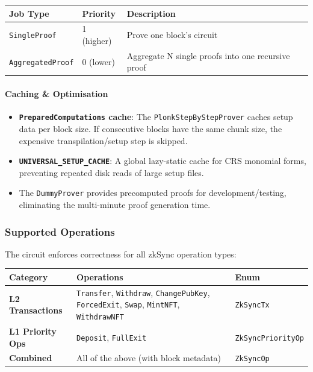 \begin{table}[h]
\centering
\begin{tabular}{lll}
\toprule
\textbf{Job Type} & \textbf{Priority} & \textbf{Description} \\
\midrule
\texttt{SingleProof} & 1 (higher) & Prove one block's circuit \\
\texttt{AggregatedProof} & 0 (lower) & Aggregate N single proofs into one recursive proof \\
\bottomrule
\end{tabular}
\end{table}

\paragraph{Caching \& Optimisation}

\begin{itemize}
    \item \textbf{\texttt{PreparedComputations} cache}: The \texttt{PlonkStepByStepProver} caches setup data per block size. If consecutive blocks have the same chunk size, the expensive transpilation/setup step is skipped.
    \item \textbf{\texttt{UNIVERSAL\_SETUP\_CACHE}}: A global lazy-static cache for CRS monomial forms, preventing repeated disk reads of large setup files.
    \item The \texttt{DummyProver} provides precomputed proofs for development/testing, eliminating the multi-minute proof generation time.
\end{itemize}

\subsubsection{Supported Operations}

The circuit enforces correctness for all zkSync operation types:

\begin{table}[h]
\centering
\begin{tabular}{lll}
\toprule
\textbf{Category} & \textbf{Operations} & \textbf{Enum} \\
\midrule
\textbf{L2 Transactions} & \texttt{Transfer}, \texttt{Withdraw}, \texttt{ChangePubKey}, \texttt{ForcedExit}, \texttt{Swap}, \texttt{MintNFT}, \texttt{WithdrawNFT} & \texttt{ZkSyncTx} \\
\textbf{L1 Priority Ops} & \texttt{Deposit}, \texttt{FullExit} & \texttt{ZkSyncPriorityOp} \\
\textbf{Combined} & All of the above (with block metadata) & \texttt{ZkSyncOp} \\
\bottomrule
\end{tabular}
\end{table}

